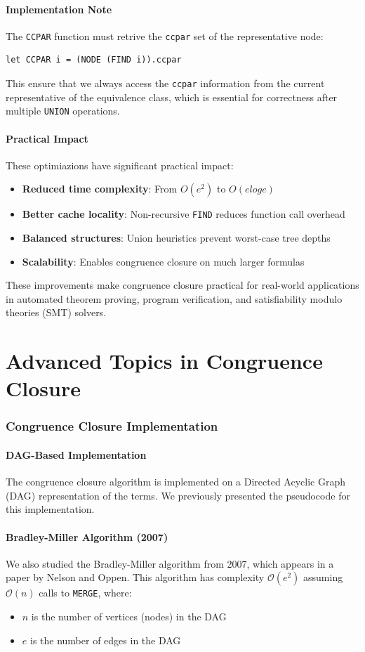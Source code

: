 \documentclass[a4paper]{article}
\theoremstyle{definition}
\begin{document}
\subsection{Implementation Note}
The \texttt{CCPAR} function must retrive the \texttt{ccpar} set of the representative node:
\begin{lstlisting}[style=ocamlpseudo]
let CCPAR i = (NODE (FIND i)).ccpar
\end{lstlisting}
This ensure that we always access the \texttt{ccpar} information from the current representative of the equivalence 
class, which is essential for correctness after multiple \texttt{UNION} operations.
\subsection{Practical Impact}
These optimiazions have significant practical impact:
\begin{itemize}
	\item \textbf{Reduced time complexity}: From \( O(e^2) \) to \( O(e log e) \)    
	\item \textbf{Better cache locality}: Non-recursive \texttt{FIND} reduces function call overhead
	\item \textbf{Balanced structures}: Union heuristics prevent worst-case tree depths 
	\item \textbf{Scalability}: Enables congruence closure on much larger formulas 
\end{itemize} 
These improvements make congruence closure practical for real-world applications in automated theorem proving,
program verification, and satisfiability modulo theories (SMT) solvers.
\part{Advanced Topics in Congruence Closure}
\section{Congruence Closure Implementation}
\subsection{DAG-Based Implementation}
The congruence closure algorithm is implemented on a Directed Acyclic Graph (DAG) representation of the terms.
We previously presented the pseudocode for this implementation.
\subsection{Bradley-Miller Algorithm (2007)}
We also studied the Bradley-Miller algorithm from 2007, which appears in a paper by Nelson and Oppen. This 
algorithm has complexity \( \mathcal{O}(e^2) \) assuming \( \mathcal{O}(n) \) calls to \texttt{MERGE}, where:
\begin{itemize}
	\item \( n \) is the number of vertices (nodes) in the DAG 
	\item \( e \) is the number of edges in the DAG
\end{itemize}
\end{document}
